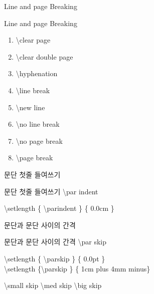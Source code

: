 \documentclass[10pt,xcolor=pdftex,dvipsnames,table,handout]{beamer}
\begin{document}
		\begin{frame}[t]{Line and page Breaking}

			\begin{block} {Line and page Breaking}
			\begin{enumerate}
			\item	\textbackslash clear page
			\item	\textbackslash clear double page
			\item	\textbackslash hyphenation
			\item	\textbackslash line break
			\item	\textbackslash new line
			\item	\textbackslash no line break
			\item	\textbackslash no page break
			\item	\textbackslash page break
			\end{enumerate}
			\end{block}

		\end{frame}

		\begin{frame}[t]{문단 첫줄 들여쓰기}

			\begin{block} {문단 첫줄 들여쓰기}
			\textbackslash par indent
			\end{block}

			\begin{example}
			\textbackslash setlength \{ \textbackslash parindent \} \{ 0.0cm \}\\
			\end{example}

		\end{frame}

		\begin{frame}[t]{문단과 문단 사이의 간격}

			\begin{block} {문단과 문단 사이의 간격}
			\textbackslash par skip
			\end{block}

			\begin{example}
			\textbackslash setlength \{ \textbackslash parskip \} \{ 0.0pt \}\\
			\textbackslash setlength \{\textbackslash parskip \} \{ 1cm plus 4mm minus\}	\\		
			\end{example}

			\begin{example}
			\textbackslash small skip
			\textbackslash med skip
			\textbackslash big skip
			\end{example}

		\end{frame}
\end{document}
